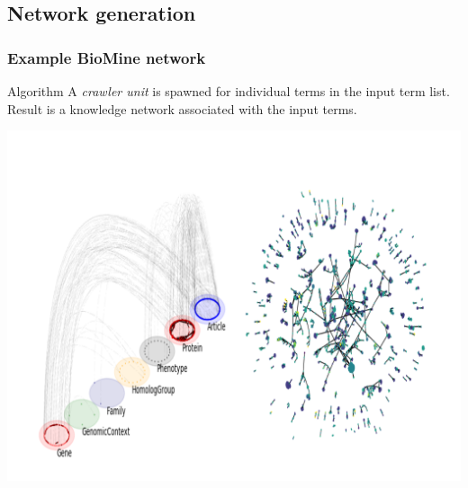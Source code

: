 \documentclass{beamer}
\begin{document}
  \subsection{Network generation}
  \begin{frame}\frametitle{Example BioMine network}
    \begin{block}{Algorithm}
      A \textit{crawler unit} is spawned for individual terms in the input term list. Result is a knowledge network associated with the input terms.
     \end{block}
     \begin{center}
       \includegraphics[scale=3.2]{images/collage2}
       \end{center}

\end{frame}
\end{document}
